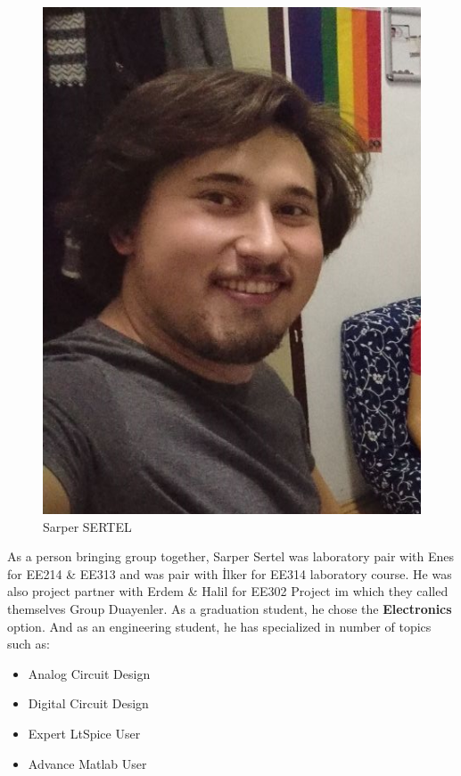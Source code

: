 \documentclass[a4paper,12pt]{article}
\begin{document}

\begin{minipage}{0.33\textwidth}
\begin{flushleft} \large

\begin{figure}[H]
	\center
	\setlength{\unitlength}{\textwidth} 
	\includegraphics[width=0.8\unitlength]{images/sarper_foto}
	\caption{\label{fig:sarper_foto} \small Sarper SERTEL }
\end{figure}


\end{flushleft}
\end{minipage}
\begin{minipage}{0.66\textwidth}
\begin{flushleft} 

	As a person bringing group together, Sarper Sertel was laboratory pair with Enes for EE214 \& EE313 and was pair with İlker for EE314 laboratory course. He was also project partner with Erdem \& Halil for EE302 Project im which they called themselves Group Duayenler. As a graduation student, he chose the \textbf{Electronics} option. And as an engineering student, he has specialized in number of topics such as:
	
\begin{itemize}
	\item Analog Circuit Design
	\item Digital Circuit Design
	\item Expert LtSpice User
	\item Advance Matlab User
\end{itemize}


\end{flushleft}
\end{minipage}\\[0.4cm]
\end{document}
